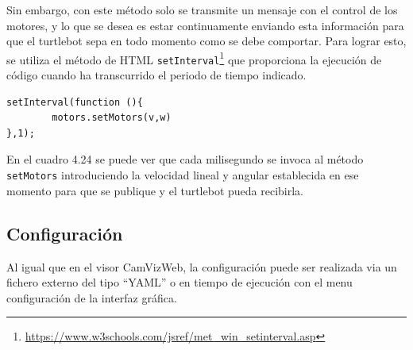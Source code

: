 Sin embargo, con este método solo se transmite un mensaje con el control de los motores, y lo que se desea es estar continuamente enviando esta información para que el turtlebot sepa en todo momento como se debe comportar. Para lograr esto, se utiliza el método de HTML \texttt{setInterval}\footnote{\url{https://www.w3schools.com/jsref/met_win_setinterval.asp}} que proporciona la ejecución de código cuando ha transcurrido el periodo de tiempo indicado.

\begin{lstlisting}[caption= Invocación cada milisegundo al método para publicar el mensaje con los motores, label=cod.setintervalTurtle]
setInterval(function (){
        motors.setMotors(v,w)
},1);
\end{lstlisting}

En el cuadro 4.24 se puede ver que cada milisegundo se invoca al método \texttt{setMotors} introduciendo la velocidad lineal y angular establecida en ese momento para que se publique y el turtlebot pueda recibirla.

\subsection{Configuración}
Al igual que en el visor CamVizWeb, la configuración puede ser realizada via un fichero externo del tipo ``YAML'' o en tiempo de ejecución con el menu configuración de la interfaz gráfica.

